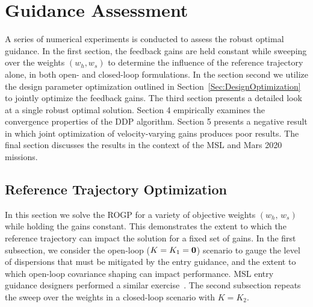 \chapter{Guidance Assessment}\label{Ch:NumericalAssessment}
A series of numerical experiments is conducted to assess the robust optimal guidance. In the first section, the feedback gains are held constant while sweeping over the weights $(w_h,w_s)$ to determine the influence of the reference trajectory alone, in both open- and closed-loop formulations. In the section second we utilize the design parameter optimization outlined in Section~\ref{Sec:DesignOptimization} to jointly optimize the feedback gains. The third section presents a detailed look at a single robust optimal solution. Section 4 empirically examines the convergence properties of the DDP algorithm. Section 5 presents a negative result in which joint optimization of velocity-varying gains produces poor results. The final section discusses the results in the context of the MSL and Mars 2020 missions.

\section{Reference Trajectory Optimization}
In this section we solve the ROGP for a variety of objective weights $(w_h,\,w_s)$ while holding the gains constant. This demonstrates the extent to which the reference trajectory can impact the solution for a fixed set of gains. In the first subsection, we consider the open-loop ($K=K_1=\mathbf{0}$) scenario to gauge the level of dispersions that must be mitigated by the entry guidance, and the extent to which open-loop covariance shaping can impact performance. MSL entry guidance designers performed a similar exercise~\cite{MSL_EDL2}. The second subsection repeats the sweep over the weights in a closed-loop scenario with $K=K_2$.

